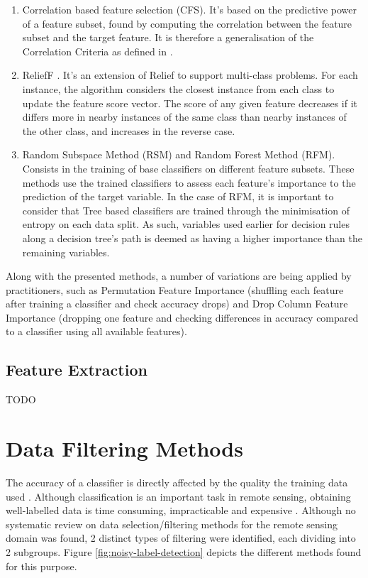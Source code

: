 \documentclass[12pt, english, openany]{book}
\begin{document}
\begin{enumerate}
  \item Correlation based feature selection (CFS). It's based on the predictive
  power of a feature subset, found by computing the correlation between the
  feature subset and the target feature. It is therefore a generalisation
  of the Correlation Criteria as defined in \cite{Ghojogh2019}.
  \item ReliefF \cite{kononenko1997}. It's an extension of Relief
  \cite{kira1992} to support multi-class problems. For each instance, the
  algorithm considers the closest instance from each class to update the
  feature score vector. The score of any given feature decreases if it differs
  more in nearby instances of the same class than nearby instances of the other
  class, and increases in the reverse case.
  \item Random Subspace Method (RSM) and Random Forest Method (RFM). Consists
  in the training of base classifiers on different feature subsets. These
  methods use the trained classifiers to assess each feature's importance to
  the prediction of the target variable. In the case of RFM, it is important to
  consider that Tree based classifiers are trained through the minimisation of
  entropy on each data split. As such, variables used earlier for decision
  rules along a decision tree's path is deemed as having a higher importance
  than the remaining variables.
\end{enumerate}

Along with the presented methods, a number of variations are being applied by
practitioners, such as Permutation Feature Importance (shuffling each feature
after training a classifier and check accuracy drops) and Drop Column Feature
Importance (dropping one feature and checking differences in accuracy compared
to a classifier using all available features).


\subsection*{Feature Extraction}
TODO


\section{Data Filtering Methods}

The accuracy of a classifier is directly affected by the quality the training
data used \cite{Boukir2019}. Although classification is an important task in
remote sensing, obtaining well-labelled data is time consuming, impracticable
and expensive \cite{Pelletier2017Filtering}. Although no systematic review on
data selection/filtering methods for the remote sensing domain was found, 2
distinct types of filtering were identified, each dividing into 2 subgroups.
Figure \ref{fig:noisy-label-detection} depicts the different methods found for
this purpose.
\end{document}

